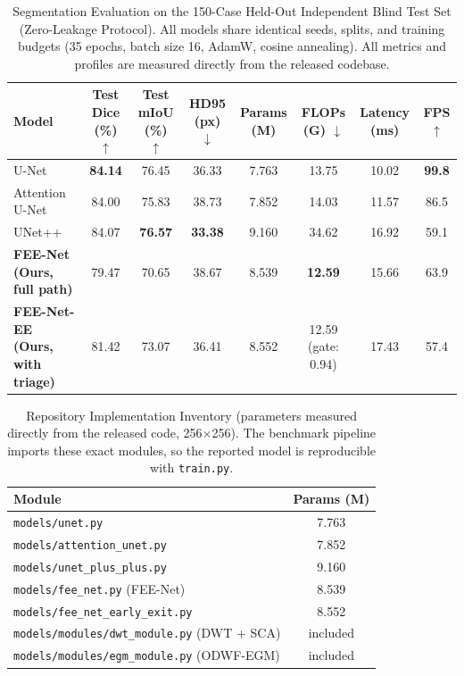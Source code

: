 \documentclass[journal]{IEEEtran}
\begin{document}
\begin{table}[t]
\centering
\caption{Segmentation Evaluation on the 150-Case Held-Out Independent Blind Test Set (Zero-Leakage Protocol). All models share identical seeds, splits, and training budgets (35 epochs, batch size 16, AdamW, cosine annealing). All metrics and profiles are measured directly from the released codebase.}
\label{tab:main_benchmark}
\begin{tabular}{l|ccc|cccc}
\toprule
\textbf{Model} & \textbf{Test Dice (\%)} $\uparrow$ & \textbf{Test mIoU (\%)} $\uparrow$ & \textbf{HD95 (px)} $\downarrow$ & \textbf{Params (M)} & \textbf{FLOPs (G)} $\downarrow$ & \textbf{Latency (ms)} & \textbf{FPS} $\uparrow$ \\
\midrule
U-Net~\cite{ronneberger2015u} & \textbf{84.14} & 76.45 & 36.33 & 7.763 & 13.75 & 10.02 & \textbf{99.8} \\
Attention U-Net~\cite{oktay2018attention} & 84.00 & 75.83 & 38.73 & 7.852 & 14.03 & 11.57 & 86.5 \\
UNet++~\cite{zhou2019unetplusplus} & 84.07 & \textbf{76.57} & \textbf{33.38} & 9.160 & 34.62 & 16.92 & 59.1 \\
\midrule
\textbf{FEE-Net (Ours, full path)} & 79.47 & 70.65 & 38.67 & 8.539 & \textbf{12.59} & 15.66 & 63.9 \\
\textbf{FEE-Net-EE (Ours, with triage)} & 81.42 & 73.07 & 36.41 & 8.552 & 12.59 (gate: 0.94) & 17.43 & 57.4 \\
\bottomrule
\end{tabular}
\end{table}

\begin{table}[t]
\centering
\caption{Repository Implementation Inventory (parameters measured directly from the released code, 256$\times$256). The benchmark pipeline imports these exact modules, so the reported model is reproducible with \texttt{train.py}.}
\label{tab:inventory}
\begin{tabular}{lc}
\toprule
\textbf{Module} & \textbf{Params (M)} \\
\midrule
\texttt{models/unet.py} & 7.763 \\
\texttt{models/attention\_unet.py} & 7.852 \\
\texttt{models/unet\_plus\_plus.py} & 9.160 \\
\texttt{models/fee\_net.py} (FEE-Net) & 8.539 \\
\texttt{models/fee\_net\_early\_exit.py} & 8.552 \\
\texttt{models/modules/dwt\_module.py} (DWT + SCA) & included \\
\texttt{models/modules/egm\_module.py} (ODWF-EGM) & included \\
\bottomrule
\end{tabular}
\end{table}
\end{document}
